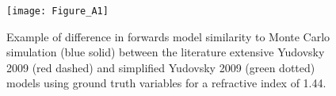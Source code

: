 % 
\begin{figure}[htb!]
    \centering
    \texttt{[image: Figure\_A1]}
    \caption{Example of difference in forwards model similarity to Monte Carlo simulation (blue solid) between the literature extensive Yudovsky 2009 (red dashed) and simplified Yudovsky 2009 (green dotted) models using ground truth variables for a refractive index of 1.44.}
 \label{fig:badYudovsky}
\end{figure}
\FloatBarrier


